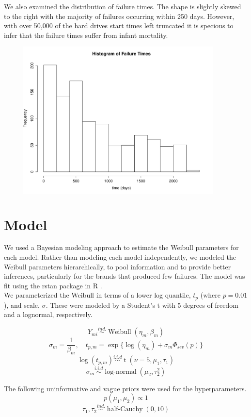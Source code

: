 \documentclass{scrartcl}
\begin{document}
\noindent We also examined the distribution of failure times.  The shape is slightly skewed to the right with the majority of failures occurring within 250 days. However, with over 50,000 of the hard drives start times left truncated it is specious to infer that the failure times suffer from infant mortality.   
\begin{figure}[H]
\centering
\includegraphics[height=8cm]{failhist.pdf}
\end{figure}

\section*{Model}
\noindent We used a Bayesian modeling approach to estimate the Weibull parameters for each model. Rather than modeling each model independently, we modeled the Weibull parameters hierarchically, to pool information and to provide better inferences, particularly for the brands that produced few failures. The model was fit using the rstan package in R \cite{stan}.\\

\noindent We parameterized the Weibull in terms of a lower log quantile, $t_p$ (where $p=0.01$), and scale, $\sigma$. These were modeled by a Student's t with 5 degrees of freedom and a lognormal, respectively.

\[Y_{mi} \stackrel{ind.}{\sim} \operatorname{Weibull}(\eta_m, \beta_m)\]
\[\sigma_m = \frac{1}{\beta_m}, \quad t_{p,m} = \exp\{\log(\eta_m) + \sigma_m \Phi_{sev}(p)\}\]
\[\log(t_{p,m}) \stackrel{i.i.d}{\sim} \operatorname{t}(\nu = 5, \mu_1, \tau_1)\]
\[\sigma_m \stackrel{i.i.d}{\sim} \operatorname{log-normal}(\mu_2, \tau^2_2)\]

\noindent The following uninformative and vague priors were used for the hyperparameters.
\[p(\mu_1,\mu_2) \propto 1\]
\[\tau_1,\tau_2 \stackrel{ind.}{\sim} \operatorname{half-Cauchy}(0,10)\]
\end{document}

